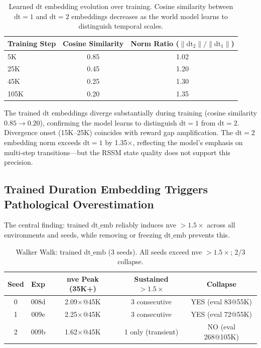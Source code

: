 \documentclass[10pt,letterpaper]{article}
\newcommand{\dt}{\mathrm{dt}}
\begin{document}
\begin{table}[h]
\centering
\caption{Learned $\dt$ embedding evolution over training. Cosine similarity between $\dt=1$ and $\dt=2$ embeddings decreases as the world model learns to distinguish temporal scales.}
\label{tab:dt_emb_cosine}
\begin{tabular}{lcc}
\toprule
Training Step & Cosine Similarity & Norm Ratio ($\|\dt_2\|/\|\dt_1\|$) \\
\midrule
5K   & 0.85 & 1.02 \\
25K  & 0.45 & 1.20 \\
45K  & 0.25 & 1.30 \\
105K & 0.20 & 1.35 \\
\bottomrule
\end{tabular}
\end{table}

The trained $\dt$ embeddings diverge substantially during training (cosine similarity $0.85 \rightarrow 0.20$), confirming the model learns to distinguish $\dt=1$ from $\dt=2$.
Divergence onset (15K--25K) coincides with reward gap amplification.
The $\dt=2$ embedding norm exceeds $\dt=1$ by 1.35$\times$, reflecting the model's emphasis on multi-step transitions---but the RSSM state quality does not support this precision.

\subsection{Trained Duration Embedding Triggers Pathological Overestimation}
\label{sec:trained_dt_emb}

The central finding: trained $\dt\_\text{emb}$ reliably induces nve $> 1.5\times$ across all environments and seeds, while removing or freezing $\dt\_\text{emb}$ prevents this.

\begin{table}[h]
\centering
\caption{Walker Walk: trained $\dt\_\text{emb}$ (3 seeds). All seeds exceed nve $> 1.5\times$; 2/3 collapse.}
\label{tab:walker_trained}
\begin{tabular}{ccccc}
\toprule
Seed & Exp & nve Peak (35K+) & Sustained $> 1.5\times$ & Collapse \\
\midrule
0 & 008d & 2.09$\times$@45K & 3 consecutive & YES (eval 83@55K) \\
1 & 009e & 2.25$\times$@45K & 3 consecutive & YES (eval 72@55K) \\
2 & 009b & 1.62$\times$@45K & 1 only (transient) & NO (eval 268@105K) \\
\bottomrule
\end{tabular}
\end{table}
\end{document}
